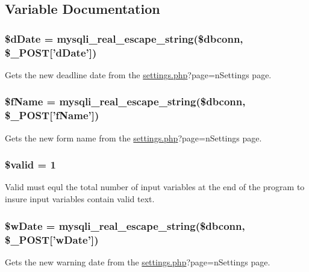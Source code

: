 \subsection{\-Variable \-Documentation}
\hypertarget{notVal_8php_abeb8d972c22c8bdcb5e9a7ce034cf93e}{
\subsubsection[{\$d\-Date}]{\setlength{\rightskip}{0pt plus 5cm}\$d\-Date = mysqli\-\_\-real\-\_\-escape\-\_\-string(\$dbconn, \$\-\_\-\-P\-O\-S\-T\mbox{[}'d\-Date'\mbox{]})}}\label{notVal_8php_abeb8d972c22c8bdcb5e9a7ce034cf93e}
\-Gets the new deadline date from the \hyperlink{settings_8php}{settings.\-php}?page=n\-Settings page. \hypertarget{notVal_8php_a3522d7ff10b2bf62bcc19a71f65a3617}{
\subsubsection[{\$f\-Name}]{\setlength{\rightskip}{0pt plus 5cm}\$f\-Name = mysqli\-\_\-real\-\_\-escape\-\_\-string(\$dbconn, \$\-\_\-\-P\-O\-S\-T\mbox{[}'f\-Name'\mbox{]})}}\label{notVal_8php_a3522d7ff10b2bf62bcc19a71f65a3617}
\-Gets the new form name from the \hyperlink{settings_8php}{settings.\-php}?page=n\-Settings page. \hypertarget{notVal_8php_a0587674d27d00ef497e08e53ccf45bbb}{
\subsubsection[{\$valid}]{\setlength{\rightskip}{0pt plus 5cm}\$valid = 1}}\label{notVal_8php_a0587674d27d00ef497e08e53ccf45bbb}
\-Valid must equl the total number of input variables at the end of the program to insure input variables contain valid text. \hypertarget{notVal_8php_a2f5503c6585d6fbb4b023dae019db907}{
\subsubsection[{\$w\-Date}]{\setlength{\rightskip}{0pt plus 5cm}\$w\-Date = mysqli\-\_\-real\-\_\-escape\-\_\-string(\$dbconn, \$\-\_\-\-P\-O\-S\-T\mbox{[}'w\-Date'\mbox{]})}}\label{notVal_8php_a2f5503c6585d6fbb4b023dae019db907}
\-Gets the new warning date from the \hyperlink{settings_8php}{settings.\-php}?page=n\-Settings page. 